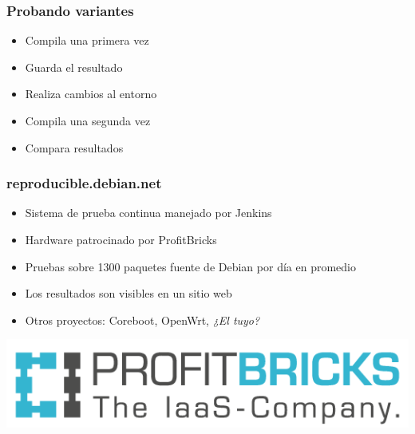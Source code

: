 \documentclass[14pt,aspectratio=169]{beamer}
\begin{document}
\begin{frame}
 \frametitle{Probando variantes}

 \begin{itemize}
  \item Compila una primera vez
  \item Guarda el resultado
  \item Realiza cambios al entorno
  \item Compila una segunda vez
  \item Compara resultados
 \end{itemize}
\end{frame}

\begin{frame}
 \frametitle{reproducible.debian.net}

 \begin{itemize}
  \item Sistema de prueba continua manejado por Jenkins
  \item Hardware patrocinado por ProfitBricks
  \item Pruebas sobre 1300 paquetes fuente de Debian por día en promedio
  \item Los resultados son visibles en un sitio web
  \item Otros proyectos: Coreboot, OpenWrt, \textit{¿El tuyo?}
 \end{itemize}
 \vfill
 \begin{center}
 \includegraphics[height=0.15\paperheight]{images/profitbricks_logo.png}
 \end{center}
\end{frame}
\end{document}
